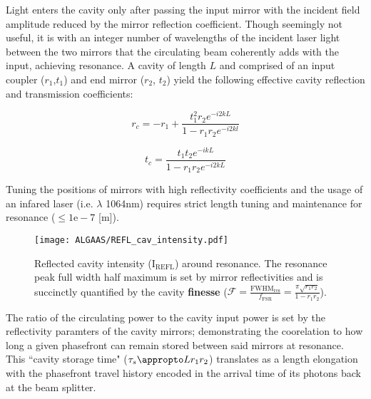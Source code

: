 Light enters the cavity only after passing the input mirror with the incident field amplitude reduced by the mirror reflection coefficient. Though seemingly not useful, it is with an integer number of wavelengths of the incident laser light between the two mirrors that the circulating beam coherently adds with the input, achieving resonance.  A cavity of length $L$ and comprised of an input coupler ($r_1$,$t_1$) and end mirror ($r_2$, $t_2$) yield the following effective cavity reflection and transmission coefficients: 

\iffalse that the input and circulating that the photons belonging to a particular phasefront can be experimentally tracked, and lucky for us this is is why we measure interference at the anti-symmetric port. But these benefit with a constant source at the cavity input the phasefronts entering the cavity are superimposed onto the circulating cavity field and, more often than not, add incoherently which can makes this thought experiment seem silly.\fi 

\begin{equation}
	r_c = -r_1 + \frac{t^2_1r_2 e^{-i2kL}}{1-r_1 r_2 e^{-i2kl}}
\end{equation}

\begin{equation}
	t_c = \frac{t_1 t_2 e^{-ikL}}{1-r_1 r_2 e^{-i2kL}}	
\end{equation}

Tuning the positions of mirrors with high reflectivity coefficients and the usage of an infared laser (i.e. $\lambda$ 1064nm) requires strict length tuning and maintenance for resonance ($\leq 1\mathrm{e-}7$ [m]). 

\begin{figure}[H]
\texttt{[image: ALGAAS/REFL\_cav\_intensity.pdf]}
\caption{Reflected cavity intensity (I$_\mathrm{REFL}$) around resonance. The resonance peak full width half maximum is set by mirror reflectivities and is succinctly quantified by the cavity \textbf{finesse} ($\mathscr{F} = \frac{\mathrm{FWHM}_\mathrm{res}}{f_\mathrm{FSR}} = \frac{\pi \sqrt{r_1 r_2}}{1-r_1 r_2}$).}
\label{fig:cav_length_response_DCpow}
\end{figure}

The ratio of the circulating power to the cavity input power is set by the reflectivity paramters of the cavity mirrors; demonstrating the coorelation to how long a given phasefront can remain stored between said mirrors at resonance. This ``cavity storage time" ($\tau_s \appropto L r_1 r_2$) translates as a length elongation with the phasefront travel history encoded in the arrival time of its photons back at the beam splitter.

